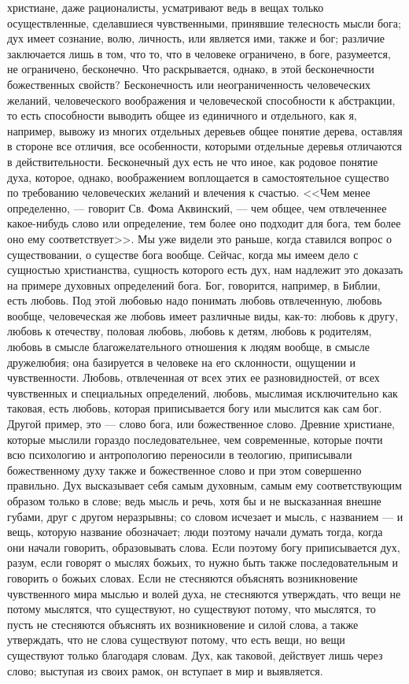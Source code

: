 \documentclass[12pt]{article}
\begin{document}
христиане, даже рационалисты, усматривают ведь в вещах только осуществленные, сделавшиеся чувственными, принявшие телесность мысли бога; дух имеет сознание, волю, личность, или является ими, также и бог; различие заключается лишь в том, что то, что в человеке ограничено, в боге, разумеется, не ограничено, бесконечно. Что раскрывается, однако, в этой бесконечности божественных свойств? Бесконечность или неограниченность человеческих желаний, человеческого воображения и человеческой способности к абстракции, то есть способности выводить общее из единичного и отдельного, как я, например, вывожу из многих отдельных деревьев общее понятие дерева, оставляя в стороне все отличия, все особенности, которыми отдельные деревья отличаются в действительности. Бесконечный дух есть не что иное, как родовое понятие духа, которое, однако, воображением воплощается в самостоятельное существо по требованию человеческих желаний и влечения к счастью. <<Чем менее определенно, --- говорит Св. Фома Аквинский, --- чем общее, чем отвлеченнее какое-нибудь слово или определение, тем более оно подходит для бога, тем более оно ему соответствует>>. Мы уже видели это раньше, когда ставился вопрос о существовании, о существе бога вообще. Сейчас, когда мы имеем дело с сущностью христианства, сущность которого есть дух, нам надлежит это доказать на примере духовных определений бога. Бог, говорится, например, в Библии, есть любовь. Под этой любовью надо понимать любовь отвлеченную, любовь вообще, человеческая же любовь имеет различные виды, как-то: любовь к другу, любовь к отечеству, половая любовь, любовь к детям, любовь к родителям, любовь в смысле благожелательного отношения к людям вообще, в смысле дружелюбия; она базируется в человеке на его склонности, ощущении и чувственности. Любовь, отвлеченная от всех этих ее разновидностей, от всех чувственных и специальных определений, любовь, мыслимая исключительно как таковая, есть любовь, которая приписывается богу или мыслится как сам бог. Другой пример, это --- слово бога, или божественное слово. Древние христиане, которые мыслили гораздо последовательнее, чем современные, которые почти всю психологию и антропологию переносили в теологию, приписывали божественному духу также и божественное слово и при этом совершенно правильно. Дух высказывает себя самым духовным, самым ему соответствующим образом только в слове; ведь мысль и речь, хотя бы и не высказанная внешне губами, друг с другом неразрывны; со словом исчезает и мысль, с названием --- и вещь, которую название обозначает; люди поэтому начали думать тогда, когда они начали говорить, образовывать слова. Если поэтому богу приписывается дух, разум, если говорят о мыслях божьих, то нужно быть также последовательным и говорить о божьих словах. Если не стесняются объяснять возникновение чувственного мира мыслью и волей духа, не стесняются утверждать, что вещи не потому мыслятся, что существуют, но существуют потому, что мыслятся, то пусть не стесняются объяснять их возникновение и силой слова, а также утверждать, что не слова существуют потому, что есть вещи, но вещи существуют только благодаря словам. Дух, как таковой, действует лишь через слово; выступая из своих рамок, он вступает в мир и выявляется. 
\end{document}
